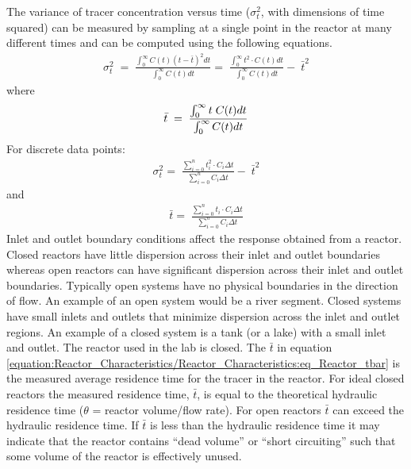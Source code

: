 \documentclass[letterpaper,10pt,english]{sphinxmanual}
\begin{document}
The variance of tracer concentration versus time (\(\sigma _{t}^{2}\), with dimensions of time squared) can be measured by sampling at a single point in the reactor at many different times and can be computed using the following equations.
\begin{equation}\label{equation:Reactor_Characteristics/Reactor_Characteristics:Reactor_Characteristics/Reactor_Characteristics:11}
\begin{split}\sigma _{t}^{2} \; =\; \frac{\int _{0}^{\infty }C(t)(t-\bar{t})^{2}  dt}{\int _{0}^{\infty }C(t) dt} =\; \frac{\int _{0}^{\infty }t^{2} \cdot C(t) dt}{\int _{0}^{\infty }C(t) dt} -\; \bar{t}^{2}\end{split}
\end{equation}
where
\begin{equation}\label{equation:Reactor_Characteristics/Reactor_Characteristics:Reactor_Characteristics/Reactor_Characteristics:12}
\begin{split}\bar{t}{\rm \; }={\rm \; }\frac{\int _{0}^{\infty }t\; C(t)dt }{\int _{0}^{\infty }C(t)dt }\end{split}
\end{equation}
For discrete data points:
\begin{equation}\label{equation:Reactor_Characteristics/Reactor_Characteristics:eq_Reactor_sigma}
\begin{split} \sigma _{t}^{2} =\; \frac{\sum _{i=0}^{n}t_{i}^{2} \cdot C_{i}  \Delta t}{\sum _{i=0}^{n}C_{i}  \Delta t} -\; \bar{t}^{2}\end{split}
\end{equation}
and
\begin{equation}\label{equation:Reactor_Characteristics/Reactor_Characteristics:eq_Reactor_tbar}
\begin{split} \bar{t}=\; \frac{\sum _{i=0}^{n}t_{i} \cdot C_{i}  \Delta t}{\sum _{i=0}^{n}C_{i}  \Delta t}\end{split}
\end{equation}
Inlet and outlet boundary conditions affect the response obtained from a reactor. Closed reactors have little dispersion across their inlet and outlet boundaries whereas open reactors can have significant dispersion across their inlet and outlet boundaries. Typically open systems have no physical boundaries in the direction of flow. An example of an open system would be a river segment. Closed systems have small inlets and outlets that minimize dispersion across the inlet and outlet regions. An example of a closed system is a tank (or a lake) with a small inlet and outlet. The reactor used in the lab is closed. The \(\bar{t}\) in equation \eqref{equation:Reactor_Characteristics/Reactor_Characteristics:eq_Reactor_tbar} is the measured average residence time for the tracer in the reactor. For ideal closed reactors the measured residence time, \(\bar{t}\), is equal to the theoretical hydraulic residence time (\(\theta\) = reactor volume/flow rate). For open reactors \(\bar{t}\) can exceed the hydraulic residence time. If \(\bar{t}\) is less than the hydraulic residence time it may indicate that the reactor contains “dead volume” or “short circuiting” such that some volume of the reactor is effectively unused.
\end{document}
